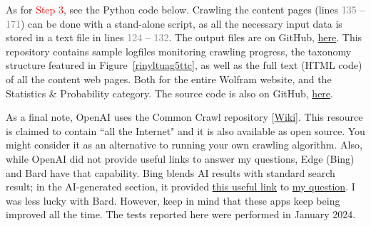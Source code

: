 \documentclass[oneside,10pt]{book}
\begin{document}
As for \textcolor{red}{Step 3}, see the Python code below. Crawling the content pages (lines \textcolor{gray}{135} -- \textcolor{gray}{171}) can be done with a stand-alone script, as all the necessary input data is stored in a text file in lines
 \textcolor{gray}{124} -- \textcolor{gray}{132}. The output files are on GitHub, \href{https://github.com/VincentGranville/Large-Language-Models}{here}. This repository contains sample logfiles monitoring crawling  progress, the taxonomy structure featured
 in Figure~\ref{rinyltuag5ttc}, as well as the full text (HTML code) of all the content web pages. Both for the entire Wolfram website, and
 the Statistics \& Probability category.
The source code is also on GitHub, \href{https://github.com/VincentGranville/Large-Language-Models/blob/main/crawl_directory.py}{here}.

As a final note, \textcolor{index}{OpenAI} uses the \textcolor{index}{Common Crawl} repository [\href{https://en.wikipedia.org/wiki/Common_Crawl}{Wiki}]. This resource is claimed to contain ``all the Internet" and it is also available as open source. You might consider it as an alternative to running your own crawling algorithm. Also, while OpenAI did not provide useful links to answer my questions, Edge (Bing) and \textcolor{index}{Bard} have that capability. Bing blends AI results with standard search result; in the AI-generated section, it provided 
\href{https://math.stackexchange.com/questions/89030/expectation-of-the-maximum-of-gaussian-random-variables}{this useful link} to 
 \href{https://www.bing.com/search?q=what+is+the+asymptotic+expectation+of+the+range+for+gaussian+distributions}{my question}.
 I was less lucky with Bard. However, keep in mind that these apps keep being improved all the time. The tests reported here were performed in January 2024.

\vspace{1ex}
\end{document}
